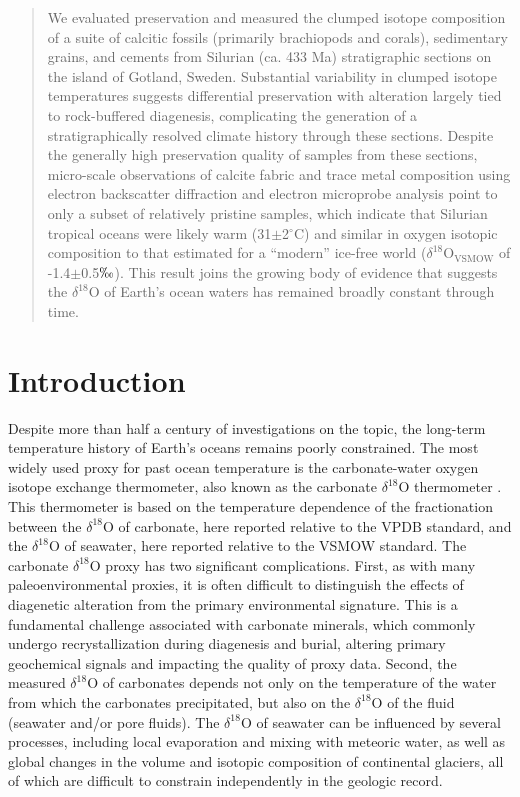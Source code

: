 \documentclass[5p, authoryear]{elsarticle}
\begin{document}
\begin{frontmatter}
\begin{abstract}
We evaluated preservation and measured the clumped isotope composition of a suite of calcitic fossils (primarily brachiopods and corals), sedimentary grains, and cements from Silurian (ca. 433 Ma) stratigraphic sections on the island of Gotland, Sweden. Substantial variability in clumped isotope temperatures suggests differential preservation with alteration largely tied to rock-buffered diagenesis, complicating the generation of a stratigraphically resolved climate history through these sections. Despite the generally high preservation quality of samples from these sections, micro-scale observations of calcite fabric and trace metal composition using electron backscatter diffraction and electron microprobe analysis point to only a subset of relatively pristine samples, which indicate that Silurian tropical oceans were likely warm (31$\pm$2$^{\circ}$C) and similar in oxygen isotopic composition to that estimated for a ``modern'' ice-free world ($\delta^{18}$O$_{\text{VSMOW}}$ of -1.4$\pm$0.5$\permil$). This result joins the growing body of evidence that suggests the $\delta^{18}$O of Earth's ocean waters has remained broadly constant through time. 
 
\end{abstract}

\end{frontmatter}

\section{Introduction}

Despite more than half a century of investigations on the topic, the long-term temperature history of Earth's oceans remains poorly constrained. The most widely used proxy for past ocean temperature is the carbonate-water oxygen isotope exchange thermometer, also known as the carbonate $\delta^{18}$O thermometer \citep{Urey1947}. This thermometer is based on the temperature dependence of the fractionation between the $\delta^{18}$O of carbonate, here reported relative to the VPDB standard, and the $\delta^{18}$O of seawater, here reported relative to the VSMOW standard. The carbonate $\delta^{18}$O proxy has two significant complications. First, as with many paleoenvironmental proxies, it is often difficult to distinguish the effects of diagenetic alteration from the primary environmental signature. This is a fundamental challenge associated with carbonate minerals, which commonly undergo recrystallization during diagenesis and burial, altering primary geochemical signals and impacting the quality of proxy data. Second, the measured $\delta^{18}$O of carbonates depends not only on the temperature of the water from which the carbonates precipitated, but also on the $\delta^{18}$O of the fluid (seawater and/or pore fluids). The $\delta^{18}$O of seawater can be influenced by several processes, including local evaporation and mixing with meteoric water, as well as global changes in the volume and isotopic composition of continental glaciers, all of which are difficult to constrain independently in the geologic record. 
\end{document}
